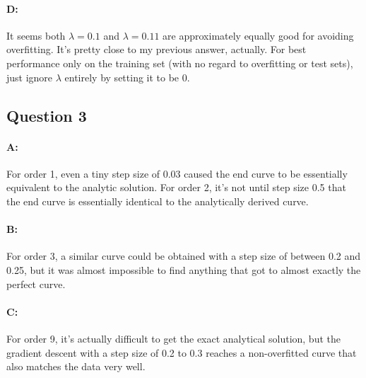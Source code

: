 \documentclass{article}
\begin{document}
\paragraph{D: } It seems both $\lambda=0.1$ and $\lambda=0.11$ are approximately equally good for avoiding overfitting. It's pretty close to my previous answer, actually. For best performance only on the training set (with no regard to overfitting or test sets), just ignore $\lambda$ entirely by setting it to be $0$.

\subsection{Question 3}

\paragraph{A: } For order 1, even a tiny step size of 0.03 caused the end curve to be essentially equivalent to the analytic solution. For order 2, it's not until step size 0.5 that the end curve is essentially identical to the analytically derived curve.

\paragraph{B: } For order 3, a similar curve could be obtained with a step size of between 0.2 and 0.25, but it was almost impossible to find anything that got to almost exactly the perfect curve.

\paragraph{C: } For order 9, it's actually difficult to get the exact analytical solution, but the gradient descent with a step size of 0.2 to 0.3 reaches a non-overfitted curve that also matches the data very well.
\end{document}
